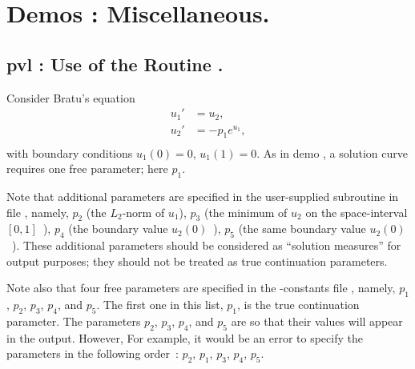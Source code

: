 \documentclass[12pt]{report}
\begin{document}
\chapter{ \AUTO Demos : Miscellaneous.} \label{ch:Demos_Misc}

\newpage
\section{ pvl : Use of the Routine .} \label{sec:Demos_pvl}

Consider Bratu's equation
\begin{equation} \begin{array}{cl}
  u_1 ' &= u_2  ,  \\
  u_2 ' &= -p_1  e^{u_1} , \\ 
\end{array} \end{equation}
with boundary conditions $ u_1(0)=0$, $u_1(1)=0.$
As in demo , a solution curve requires one free parameter;
here $p_1$.

Note that additional parameters are specified in the user-supplied subroutine 
 in file , namely,
$p_2$ (the $L_2$-norm of $u_1$),
$p_3$ (the minimum of $u_2$ on the space-interval $[0,1]$~),
$p_4$ (the boundary value $u_2(0)$~),
$p_5$ (the same boundary value $u_2(0)$~).
These additional parameters should be considered as ``solution measures''
for output purposes; they should not be treated as true
continuation parameters.

Note also that four free parameters are specified in the \AUTO-constants file 
, namely, $p_1$, $p_2$, $p_3$, $p_4$, and $p_5$.
The first one in this list, $p_1$, is the true continuation parameter. 
The parameters $p_2$, $p_3$, $p_4$, and $p_5$ are 
so that their values will appear in the output.
However, 
For example, it would be an error to specify the parameters
in the following order~: $p_2$, $p_1$, $p_3$, $p_4$, $p_5$.
\end{document}
